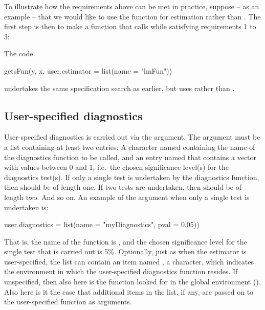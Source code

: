 %
To illustrate how the requirements above can be met in practice, suppose -- as an example -- that we would like to use the function  for estimation rather than . The first step is then to make a function that calls  while satisfying requirements 1 to 3:
%
%
The code
%
\begin{example}
  getsFun(y, x, user.estimator = list(name = "lmFun"))
\end{example}
%
undertakes the same specification search as earlier, but uses  rather than .

\subsection{User-specified diagnostics}

User-specified diagnostics is carried out via the  argument. The argument must be a list containing at least two entries: A character named  containing the name of the diagnostics function to be called, and an entry named  that contains a vector with values between 0 and 1, i.e.\ the chosen significance level(s) for the diagnostics test(s). If only a single test is undertaken by the diagnostics function, then  should be of length one. If two tests are undertaken, then  should be of length two. And so on. An example of the argument when only a single test is undertaken is:
%
\begin{example}
  user.diagnostics = list(name = "myDiagnostics", pval = 0.05))
\end{example}
%
That is, the name of the function is , and the chosen significance level for the single test that is carried out is 5\%. Optionally, just as when the estimator is user-specified, the list can contain an item named , a character, which indicates the environment in which the user-specified diagnostics function resides. If unspecified, then also here is the function looked for in the global environment (). Also here is it the case that additional items in the list, if any, are passed on to the user-specified function as arguments.

